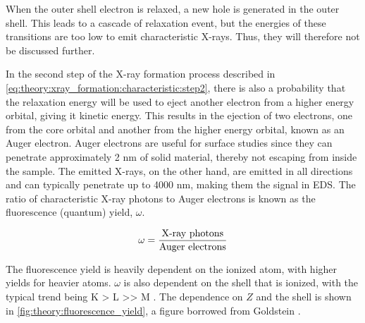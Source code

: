 When the outer shell electron is relaxed, a new hole is generated in the outer shell.
This leads to a cascade of relaxation event, but the energies of these transitions are too low to emit characteristic X-rays.
Thus, they will therefore not be discussed further.


In the second step of the X-ray formation process described in \cref{eq:theory:xray_formation:characteristic:step2}, there is also a probability that the relaxation energy will be used to eject another electron from a higher energy orbital, giving it kinetic energy. This results in the ejection of two electrons, one from the core orbital and another from the higher energy orbital, known as an Auger electron. Auger electrons are useful for surface studies since they can penetrate approximately 2 nm of solid material, thereby not escaping from inside the sample. The emitted X-rays, on the other hand, are emitted in all directions and can typically penetrate up to 4000 nm, making them the signal in EDS. The ratio of characteristic X-ray photons to Auger electrons is known as the fluorescence (quantum) yield, $\omega$.

\begin{equation}
    \label{eq:theory:theoreticalxray:yield}
    \omega = \frac{\textnormal{X-ray photons}}{\textnormal{Auger electrons}}
\end{equation}

The fluorescence yield is heavily dependent on the ionized atom, with higher yields for heavier atoms.
$\omega$ is also dependent on the shell that is ionized, with the typical trend being K > L >> M \cite[p. 267]{goldstein_scanning_2018}.
The dependence on $Z$ and the shell is shown in \cref{fig:theory:fluorescence_yield}, a figure borrowed from Goldstein \cite{goldstein_scanning_2018}.

